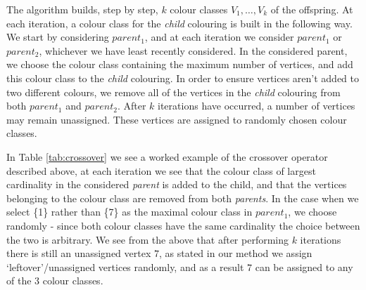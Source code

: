 \documentclass[12pt,a4paper]{article}
\begin{document}
\par The algorithm builds, step by step, $k$ colour classes $V_1, \dots , V_k$ of the offspring. At each iteration, a colour class for the \textit{child} colouring is built in the following way. We start by considering $parent_1$, and at each iteration we consider $parent_1$ or $parent_2$, whichever we have least recently considered. In the considered parent, we choose the colour class containing the maximum number of vertices, and add this colour class to the \textit{child} colouring. In order to ensure vertices aren't added to two different colours, we remove all of the vertices in the \textit{child} colouring from both $parent_1$ and $parent_2$. After $k$ iterations have occurred, a number of vertices may remain unassigned. These vertices are assigned to randomly chosen colour classes.

\par In Table \ref{tab:crossover} we see a worked example of the crossover operator described above, at each iteration we see that the colour class of largest cardinality in the considered \textit{parent} is added to the child, and that the vertices belonging to the colour class are removed from both \textit{parents}. In the case when we select \{1\} rather than \{7\} as the maximal colour class in $parent_1$, we choose randomly - since both colour classes have the same cardinality the choice between the two is arbitrary. We see from the above that after performing $k$ iterations there is still an unassigned vertex $7$, as stated in our method we assign `leftover'/unassigned vertices randomly, and as a result $7$ can be assigned to any of the $3$ colour classes.
\end{document}
